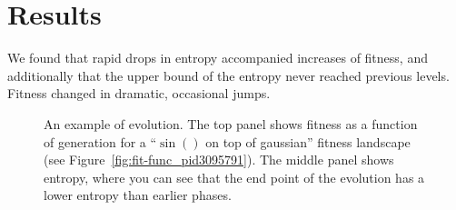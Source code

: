 \documentclass[11pt]{article}
\begin{document}
\section{Results}
\label{sec:orged0917a}

We found that rapid drops in entropy accompanied increases of fitness,
and additionally that the upper bound of the entropy never reached
previous levels.  Fitness changed in dramatic, occasional jumps.

\begin{figure}[h]
  \centering
  \caption{An example of evolution.  The top panel shows fitness as a
    function of generation for a ``$\sin()$ on top of gaussian''
    fitness landscape (see Figure~\ref{fig:fit-func_pid3095791}).  The
    middle panel shows entropy, where you can see that the end point
    of the evolution has a lower entropy than earlier phases.}
  \label{fig:gen-info_pid3095791}
\end{figure}
\end{document}
